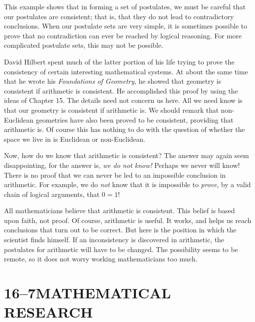 \documentclass[11pt]{book}
\begin{document}
This example shows that in forming a set of postulates, we must be careful
that our postulates are consistent; that is, that they do not lead to
contradictory conclusions. When our postulate sets are very simple, it is
sometimes possible to prove that no contradiction can ever be reached by
logical reasoning. For more complicated postulate sets, this may not be
possible.

David Hilbert spent much of the latter portion of his life trying to prove the
consistency of certain interesting mathematical systems. At about the same
time that he wrote his \emph{Foundations of Geometry}, he showed that geometry
is consistent if arithmetic is consistent. He accomplished this proof by using
the ideas of Chapter 15. The details need not concern us here. All we need
know is that our geometry is consistent if arithmetic is. We should remark
that non-Euclidean geometries have also been proved to be consistent,
providing that arithmetic is. Of course this has nothing to do with the
question of whether the space we live in is Euclidean or non-Euclidean.

Now, how do we know that arithmetic is consistent? The answer may again seem
disappointing, for the answer is, \emph{we do not know!} Perhaps we never will
know! There is no proof that we can never be led to an impossible conclusion
in arithmetic. For example, we do \emph{not} know that it is impossible to
\emph{prove}, by a valid chain of logical arguments, that $0 = 1$!

All mathematicians believe that arithmetic is consistent. This belief is based
upon faith, not proof. Of course, arithmetic is useful. It works, and helps us
reach conclusions that turn out to be correct. But here is the position in
which the scientist finds himself. If an inconsistency is discovered in
arithmetic, the postulates for arithmetic will have to be changed. The
possibility seems to be remote, so it does not worry working mathematicians
too much.

\section*{16--7\quad MATHEMATICAL RESEARCH}
\end{document}
